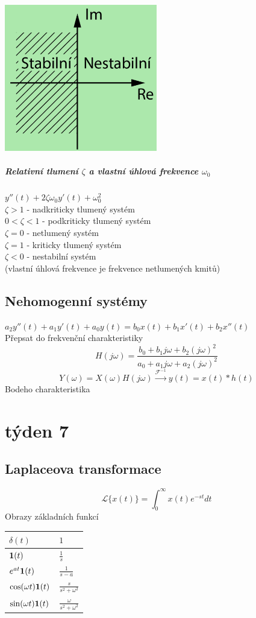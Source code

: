 \documentclass{article}
\begin{document}
			\begin{center}
				\includegraphics{stabilita.png}
			\end{center}



	\subparagraph*{Relativní tlumení $\zeta$ a vlastní úhlová frekvence $\omega_0$} 
			$y''(t)+2\zeta\omega_0 y'(t)+\omega_0^2$\\
			$\zeta > 1$ - nadkriticky tlumený systém\\
			$0 < \zeta < 1$ - podkriticky tlumený systém\\
			$\zeta = 0$ - netlumený systém\\
			$\zeta = 1$ - kriticky tlumený systém\\
			$\zeta < 0$ - nestabilní systém\\
			
		(vlastní úhlová frekvence je frekvence netlumených kmitů)

	\subsection*{Nehomogenní systémy}
		$a_2y''(t)+a_1y'(t)+a_0y(t)=b_0x(t)+b_1x'(t)+b_2x''(t)$\\
		Přepsat do frekvenční charakteristiky
		\[H(j\omega)=\frac{b_0+b_1j\omega+b_2(j\omega)^2}{a_0+a_1j\omega+a_2(j\omega)^2}\]
		\[Y(\omega)=X(\omega)H(j\omega)\overset{\mathcal{F}^{-1}}{\rightarrow}y(t)=x(t)*h(t)\]
		Bodeho charakteristika

\section*{týden 7}
	\subsection*{Laplaceova transformace}
		\[\mathcal{L}\{x(t)\}=\int_{0}^{\infty}x(t)e^{-st}dt\]
		Obrazy základních funkcí
		{\Large
		\begin{center}
			\begin{tabular}{| m{15em} | m{5em}|}\hline
				$\delta(t)$&$1$\\\hline
				${\bf 1}(t)$&$\frac{1}{s}$\\\hline
				$e^{at}{\bf 1}(t)$&$\frac{1}{s-a}$\\\hline
				$\cos(\omega t){\bf 1}(t)$&$\frac{s}{s^2+\omega^2}$\\\hline
				$\sin(\omega t){\bf 1}(t)$&$\frac{\omega}{s^2+\omega^2}$\\\hline
			\end{tabular}
		\end{center}
		}
		
\end{document}
